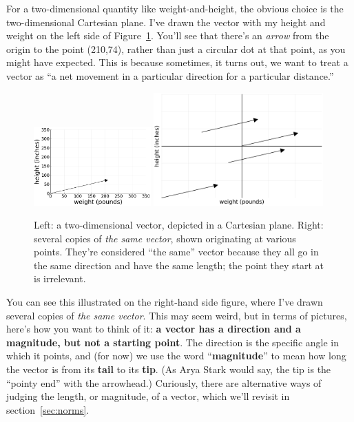 
For a two-dimensional quantity like weight-and-height, the obvious choice is
the two-dimensional Cartesian plane. I've drawn the vector with my height and
weight on the left side of Figure~\ref{fig:vector}. You'll see that there's an
\textit{arrow} from the origin to the point (210,74), rather than just a
circular dot at that point, as you might have expected. This is because
sometimes, it turns out, we want to treat a vector as ``a net movement in a
particular direction for a particular distance.''


\begin{figure}[ht]
\centering
\includegraphics[width=0.4\textwidth]{vector.png}
\includegraphics[width=0.58\textwidth]{vectors.png}
\caption{Left: a two-dimensional vector, depicted in a Cartesian plane. Right:
several copies of \textit{the same vector}, shown originating at various
points. They're considered ``the same'' vector because they all go in the same
direction and have the same length; the point they start at is irrelevant.}
\label{fig:vector}
\end{figure}


You can see this illustrated on the right-hand side figure, where I've drawn
several copies of \textit{the same vector}. This may seem weird, but in terms
of pictures, here's how you want to think of it: \textbf{a vector has a
direction and a magnitude, but not a starting point}. The direction is the
specific angle in which it points, and (for now) we use the word
``\textbf{magnitude}'' to mean how long the vector is from its \textbf{tail} to
its \textbf{tip}. (As Arya Stark would say, the tip is the ``pointy end'' with
the arrowhead.) Curiously, there are alternative ways of judging the length, or
magnitude, of a vector, which we'll revisit in section~\ref{sec:norms}.

